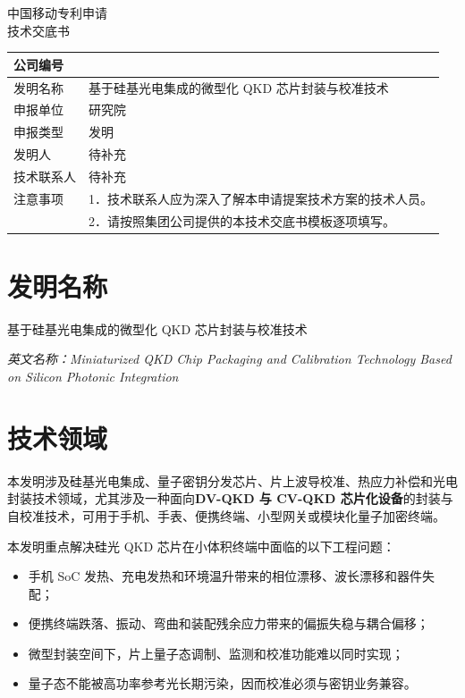 \documentclass[12pt,a4paper]{article}
\begin{document}
\begin{center}
    {\Large\heiti 中国移动专利申请} \\[1em]
    {\Huge\heiti 技术交底书} \\[1em]
\end{center}

\noindent
{
\begin{tabular}{|L{2.8cm}|L{11.8cm}|}
\hline
公司编号 &  \\
\hline
发明名称 & 基于硅基光电集成的微型化 QKD 芯片封装与校准技术 \\
\hline
申报单位 & 研究院 \\
\hline
申报类型 & 发明 \\
\hline
发明人 & 待补充 \\
\hline
技术联系人 & 待补充 \\
\hline
注意事项 & 1．技术联系人应为深入了解本申请提案技术方案的技术人员。 \\
         & 2．请按照集团公司提供的本技术交底书模板逐项填写。 \\
\hline
\end{tabular}
}

\vspace{1cm}

\section{发明名称}

基于硅基光电集成的微型化 QKD 芯片封装与校准技术

\textit{英文名称：Miniaturized QKD Chip Packaging and Calibration Technology Based on Silicon Photonic Integration}

\section{技术领域}

本发明涉及硅基光电集成、量子密钥分发芯片、片上波导校准、热应力补偿和光电封装技术领域，尤其涉及一种面向\textbf{DV-QKD 与 CV-QKD 芯片化设备}的封装与自校准技术，可用于手机、手表、便携终端、小型网关或模块化量子加密终端。

本发明重点解决硅光 QKD 芯片在小体积终端中面临的以下工程问题：
\begin{itemize}[noitemsep]
    \item 手机 SoC 发热、充电发热和环境温升带来的相位漂移、波长漂移和器件失配；
    \item 便携终端跌落、振动、弯曲和装配残余应力带来的偏振失稳与耦合偏移；
    \item 微型封装空间下，片上量子态调制、监测和校准功能难以同时实现；
    \item 量子态不能被高功率参考光长期污染，因而校准必须与密钥业务兼容。
\end{itemize}
\end{document}
